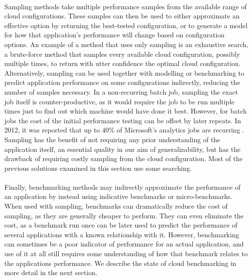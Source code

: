 \documentclass{report}
\begin{document}
\paragraph{}
Sampling methods take multiple performance samples from the available range of cloud configurations. These samples can then be used to either approximate an effective option by returning the best-tested configuration, or to generate a model for how that application's performance will change based on configuration options. An example of a method that uses only sampling is an exhaustive search, a brute-force method that samples every available cloud configuration, possibly multiple times, to return with utter confidence the optimal cloud configuration. Alternatively, sampling can be used together with modelling or benchmarking to predict application performance on some configurations indirectly, reducing the number of samples necessary.
In a non-recurring batch job, sampling the exact job itself is counter-productive, as it would require the job to be run multiple times just to find out which machine would have done it best. However, for batch jobs the cost of the initial performance testing can be offset by later repeats. In 2012, it was reported that up to 40\% of Microsoft's analytics jobs are recurring \cite{Agarwal2012,Ferguson2012b}. Sampling has the benefit of not requiring any prior understanding of the application itself, an essential quality in our aim of generalizability, but has the drawback of requiring costly sampling from the cloud configuration. Most of the previous solutions examined in this section use some searching.

\paragraph{}
Finally, benchmarking methods may indirectly approximate the performance of an application by instead using indicative benchmarks or micro-benchmarks. When used with sampling, benchmarks can dramatically reduce the cost of sampling, as they are generally cheaper to perform. They can even eliminate the cost, as a benchmark run once can be later used to predict the performance of several applications with a known relationship with it. However, benchmarking can sometimes be a poor indicator of performance for an actual application, and use of it at all still requires some understanding of how that benchmark relates to the applications performance. We describe the state of cloud benchmarking in more detail in the next section.
\end{document}
